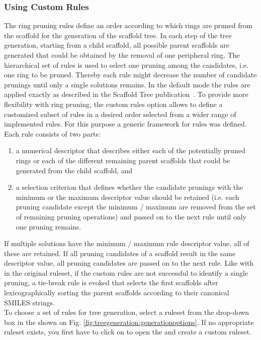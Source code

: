 \subsubsection{Using Custom Rules} \label{subsec:scaffoldhunter:customrules}
The ring pruning rules define an order according to which rings are pruned from the scaffold for the generation of the scaffold tree. In 
each step of the tree generation, starting from a child scaffold, all possible parent scaffolds are generated that could be obtained by 
the removal of one peripheral ring. The hierarchical set of rules is used to select one pruning among the candidates, i.e. one ring to be 
pruned. Thereby each rule might decrease the number of candidate prunings until only a single solutions remains. In the default mode the 
rules are applied exactly as described in the Scaffold Tree publication~\cite{schuffenhauer_et_al2007}. 
To provide more flexibility with ring pruning, the custom rules option allows to define a customized subset of rules in a desired order 
selected from a wider range of implemented rules. 
For this purpose a generic framework for rules was defined. Each rule consists of two parts:

\begin{enumerate}
 \item a numerical descriptor that describes either each of the potentially pruned rings or each of the different remaining parent 
scaffolds that could be generated from the child scaffold, and 
 \item a selection criterion that defines whether the candidate prunings with the minimum or the maximum descriptor value should be 
retained (i.e. each pruning candidate except the minimum / maximum are removed from the set of remaining pruning operations) and passed 
on to the next rule until only one pruning remains.
\end{enumerate}

If multiple solutions have the minimum / maximum rule descriptor value, all of these are retained. If all pruning candidates of a 
scaffold result in the same descriptor value, all pruning candidates are passed on to the next rule.
Like with in the original ruleset, if the custom rules are not successful to identify a single pruning, a tie-break rule is evoked that 
selects the first scaffolds after lexicographically sorting the parent scaffolds according to their canonical SMILES strings.\\

To choose a set of rules for tree generation, select a ruleset from the drop-down box in the  shown on Fig. \ref{fig:treegeneration:generationoptions}.
If no appropriate ruleset exists, you first have to click on  to open the  and create a custom ruleset.\\


